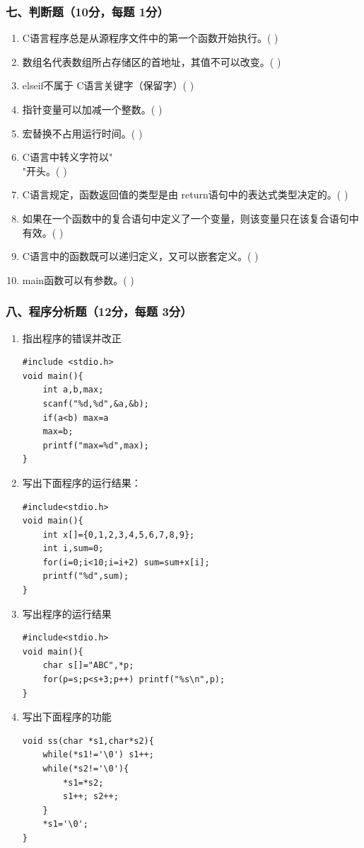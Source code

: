 \documentclass[12pt,a4paper]{article}
\begin{document}
\subsubsection*{七、判断题（10分，每题 1分）}
\begin{enumerate}
    \item C语言程序总是从源程序文件中的第一个函数开始执行。( )
    \item 数组名代表数组所占存储区的首地址，其值不可以改变。( )
    \item elseif不属于 C语言关键字（保留字）( )
    \item 指针变量可以加减一个整数。( )
    \item 宏替换不占用运行时间。( )
    \item C语言中转义字符以"\\"开头。( )
    \item C语言规定，函数返回值的类型是由 return语句中的表达式类型决定的。( )
    \item 如果在一个函数中的复合语句中定义了一个变量，则该变量只在该复合语句中有效。( )
    \item C语言中的函数既可以递归定义，又可以嵌套定义。( )
    \item main函数可以有参数。( )
\end{enumerate}

\subsubsection*{八、程序分析题（12分，每题 3分）}
\begin{enumerate}
    \item 指出程序的错误并改正
    \begin{verbatim}
#include <stdio.h>
void main(){
    int a,b,max;
    scanf("%d,%d",&a,&b);
    if(a<b) max=a
    max=b;
    printf("max=%d",max);
}
    \end{verbatim}
    
    \item 写出下面程序的运行结果：
    \begin{verbatim}
#include<stdio.h>
void main(){
    int x[]={0,1,2,3,4,5,6,7,8,9};
    int i,sum=0;
    for(i=0;i<10;i=i+2) sum=sum+x[i];
    printf("%d",sum);
}
    \end{verbatim}
    
    \item 写出程序的运行结果
    \begin{verbatim}
#include<stdio.h>
void main(){
    char s[]="ABC",*p;
    for(p=s;p<s+3;p++) printf("%s\n",p);
}
    \end{verbatim}
    
    \item 写出下面程序的功能
    \begin{verbatim}
void ss(char *s1,char*s2){
    while(*s1!='\0') s1++;
    while(*s2!='\0'){
        *s1=*s2;
        s1++; s2++;
    }
    *s1='\0';
}
    \end{verbatim}
\end{enumerate}
\end{document}
